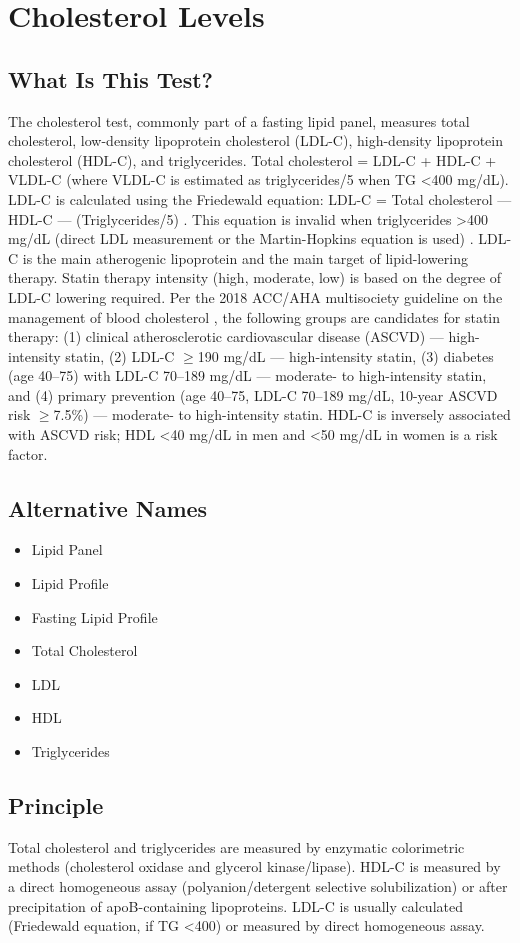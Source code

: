\chapter{Cholesterol Levels}
\section*{What Is This Test?}
The cholesterol test, commonly part of a fasting lipid panel, measures total cholesterol, low-density lipoprotein cholesterol (LDL-C), high-density lipoprotein cholesterol (HDL-C), and triglycerides. Total cholesterol = LDL-C + HDL-C + VLDL-C (where VLDL-C is estimated as triglycerides/5 when TG <400 mg/dL). LDL-C is calculated using the Friedewald equation: LDL-C = Total cholesterol --- HDL-C --- (Triglycerides/5) \cite{friedewald1972estimation}. This equation is invalid when triglycerides >400 mg/dL (direct LDL measurement or the Martin-Hopkins equation is used) \cite{martin2013comparison}. LDL-C is the main atherogenic lipoprotein and the main target of lipid-lowering therapy. Statin therapy intensity (high, moderate, low) is based on the degree of LDL-C lowering required. Per the 2018 ACC/AHA multisociety guideline on the management of blood cholesterol \cite{grundy2019guideline}, the following groups are candidates for statin therapy: (1) clinical atherosclerotic cardiovascular disease (ASCVD) --- high-intensity statin, (2) LDL-C $\geq$190 mg/dL --- high-intensity statin, (3) diabetes (age 40--75) with LDL-C 70--189 mg/dL --- moderate- to high-intensity statin, and (4) primary prevention (age 40--75, LDL-C 70--189 mg/dL, 10-year ASCVD risk $\geq$7.5\%) --- moderate- to high-intensity statin. HDL-C is inversely associated with ASCVD risk; HDL <40 mg/dL in men and <50 mg/dL in women is a risk factor.
\section*{Alternative Names}
\begin{itemize}
  \item Lipid Panel
  \item Lipid Profile
  \item Fasting Lipid Profile
  \item Total Cholesterol
  \item LDL
  \item HDL
  \item Triglycerides
\end{itemize}
\section*{Principle}
Total cholesterol and triglycerides are measured by enzymatic colorimetric methods (cholesterol oxidase and glycerol kinase/lipase). HDL-C is measured by a direct homogeneous assay (polyanion/detergent selective solubilization) or after precipitation of apoB-containing lipoproteins. LDL-C is usually calculated (Friedewald equation, if TG <400) or measured by direct homogeneous assay.
